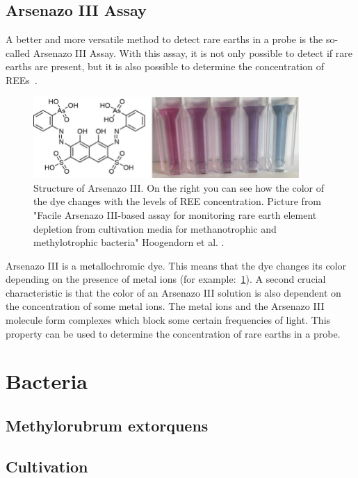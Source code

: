\subsection{Arsenazo III Assay}
A better and more versatile method to detect rare earths in a probe is the so-called Arsenazo III Assay.
With this assay, it is not only possible to detect if rare earths are present, but it is also possible to determine the concentration of REEs~\cite{arsenazo3assay}.

\begin{figure}[H]
    \centering
    \includegraphics[width=0.9\textwidth]{media/images/arsenazo3_structure_example}
    \caption{Structure of Arsenazo III. On the right you can see how the color of the dye changes with the levels of REE concentration. Picture from "Facile Arsenazo III-based assay for monitoring rare earth element depletion from cultivation media for methanotrophic and methylotrophic bacteria" Hoogendorn et al. \cite{arsenazo3assay}.}
    \label{fig:arsenazo3}
\end{figure}

Arsenazo III is a metallochromic dye.
This means that the dye changes its color depending on the presence of metal ions (for example:~\ref{fig:arsenazo3}).
A second crucial characteristic is that the color of an Arsenazo III solution is also dependent on the concentration of some metal ions.
The metal ions and the Arsenazo III molecule form complexes which block some certain frequencies of light.
This property can be used to determine the concentration of rare earths in a probe.


\section{Bacteria\authorB{}}

\subsection{Methylorubrum extorquens}

\subsection{Cultivation}

